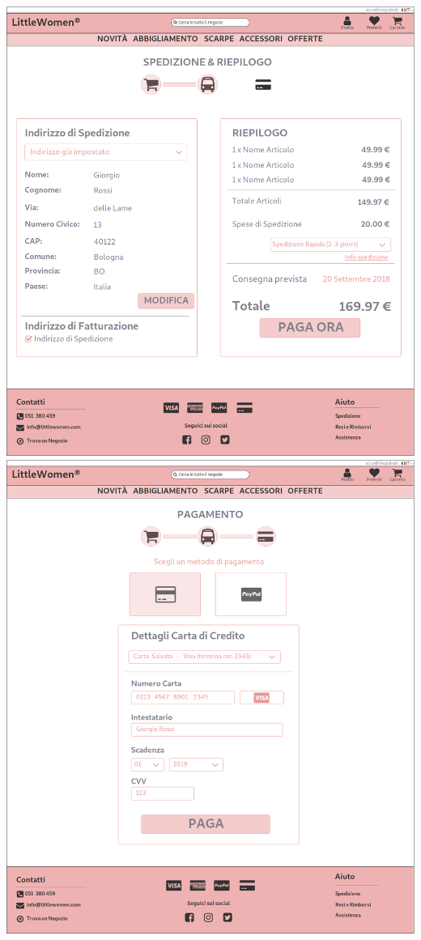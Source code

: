 \documentclass[12pt,a4paper]{report}
\begin{document}
\includegraphics[width=\textwidth]{"Project Management Sources/Wireframe/WireFrame Screenshot/Desktop/10 - Spedizione"}
\includegraphics[width=\textwidth]{"Project Management Sources/Wireframe/WireFrame Screenshot/Desktop/11 - Pagamento"}
\end{document}
